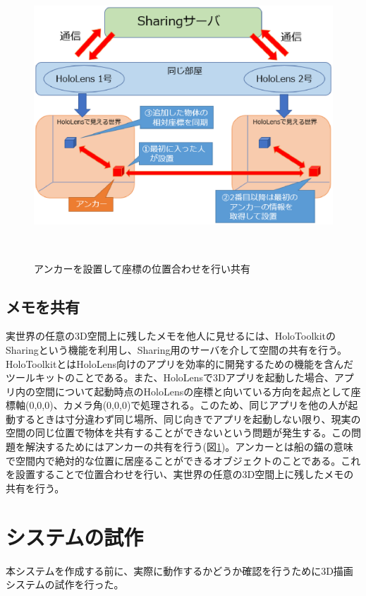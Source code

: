 \documentclass{hissymp}
\begin{document}
\begin{figure}[t]
  \begin{center}
    \includegraphics[clip,height=10.0cm,width=14.0cm]{./sharing.eps}
    \caption{アンカーを設置して座標の位置合わせを行い共有}
    \label{fig:sharing}
  \end{center}
\end{figure}

\subsection{メモを共有}
実世界の任意の3D空間上に残したメモを他人に見せるには、HoloToolkit\cite{tex7}のSharing\cite{tex8}という機能を利用し、Sharing用のサーバを介して空間の共有を行う。HoloToolkitとはHoloLens向けのアプリを効率的に開発するための機能を含んだツールキットのことである。また、HoloLensで3Dアプリを起動した場合、アプリ内の空間について起動時点のHoloLensの座標と向いている方向を起点として座標軸(0,0,0)、カメラ角(0,0,0)で処理される。このため、同じアプリを他の人が起動するときは寸分違わず同じ場所、同じ向きでアプリを起動しない限り、現実の空間の同じ位置で物体を共有することができないという問題が発生する。この問題を解決するためにはアンカーの共有を行う(図\ref{fig:sharing})。アンカーとは船の錨の意味で空間内で絶対的な位置に居座ることができるオブジェクトのことである。これを設置することで位置合わせを行い、実世界の任意の3D空間上に残したメモの共有を行う。

\section{システムの試作}
本システムを作成する前に、実際に動作するかどうか確認を行うために3D描画システムの試作を行った。
\end{document}
